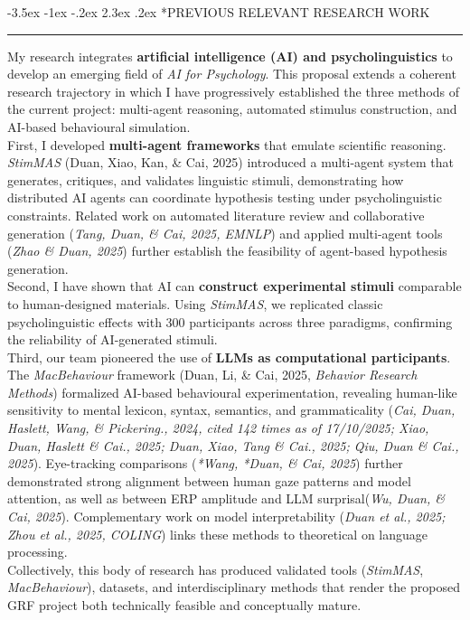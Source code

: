 \documentclass[12pt,a4paper]{article}
\makeatletter
\renewcommand{\section}{\@startsection{section}{1}{\z@}%
  {-3.5ex \@plus -1ex \@minus -.2ex}%
  {2.3ex \@plus.2ex}%
  {\normalfont\normalsize\bfseries}}
\makeatother
\begin{document}
\vspace{-2em}
\section*{PREVIOUS RELEVANT RESEARCH WORK}
\vspace{-.5em}
\hrule
\vspace{.2em}
My research integrates \textbf{artificial intelligence (AI) and psycholinguistics} to develop an emerging field of \textit{AI for Psychology}. This proposal extends a coherent research trajectory in which I have progressively established the three methods of the current project: multi-agent reasoning, automated stimulus construction, and AI-based behavioural simulation.\\
\hspace*{2em}First, I developed \textbf{multi-agent frameworks} that emulate scientific reasoning. \textit{StimMAS} (Duan, Xiao, Kan, \& Cai, 2025) introduced a multi-agent system that generates, critiques, and validates linguistic stimuli, demonstrating how distributed AI agents can coordinate hypothesis testing under psycholinguistic constraints. Related work on automated literature review and collaborative generation (\textit{Tang, Duan, \& Cai, 2025, EMNLP}) and applied multi-agent tools (\textit{Zhao \& Duan, 2025}) further establish the feasibility of agent-based hypothesis generation.\\
\hspace*{2em}Second, I have shown that AI can \textbf{construct experimental stimuli} comparable to human-designed materials. Using \textit{StimMAS}, we replicated classic psycholinguistic effects with 300 participants across three paradigms, confirming the reliability of AI-generated stimuli. \\
\hspace*{2em}Third, our team pioneered the use of \textbf{LLMs as computational participants}. The \textit{MacBehaviour} framework (Duan, Li, \& Cai, 2025, \textit{Behavior Research Methods}) formalized AI-based behavioural experimentation, revealing human-like sensitivity to mental lexicon, syntax, semantics, and grammaticality (\textit{Cai, Duan, Haslett, Wang, \& Pickering., 2024, cited 142 times as of 17/10/2025; Xiao, Duan, Haslett \& Cai., 2025; Duan, Xiao, Tang \& Cai., 2025;  Qiu, Duan \& Cai., 2025}). Eye-tracking comparisons (\textit{*Wang, *Duan, \& Cai, 2025}) further demonstrated strong alignment between human gaze patterns and model attention, as well as between ERP amplitude and LLM surprisal(\textit{Wu, Duan, \& Cai, 2025}). Complementary work on model interpretability (\textit{Duan et al., 2025; Zhou et al., 2025, COLING}) links these methods to theoretical on language processing. \\
\hspace*{2em}Collectively, this body of research has produced validated tools (\textit{StimMAS}, \textit{MacBehaviour}), datasets, and interdisciplinary methods that render the proposed GRF project both technically feasible and conceptually mature.
\end{document}
